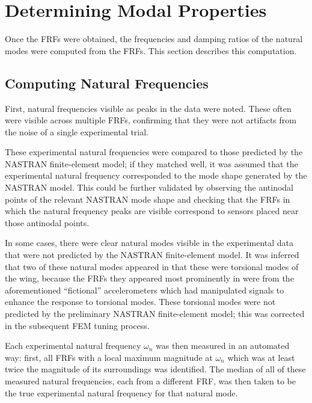 \section{Determining Modal Properties} %

Once the FRFs were obtained, the frequencies and damping ratios of the natural modes were computed from the FRFs. This section describes this computation.

\subsection{Computing Natural Frequencies}

First, natural frequencies visible as peaks in the data were noted. These often were visible across multiple FRFs, confirming that they were not artifacts from the noise of a single experimental trial.

These experimental natural frequencies were compared to those predicted by the NASTRAN finite-element model; if they matched well, it was assumed that the experimental natural frequency corresponded to the mode shape generated by the NASTRAN model. This could be further validated by observing the antinodal points of the relevant NASTRAN mode shape and checking that the FRFs in which the natural frequency peaks are visible correspond to sensors placed near those antinodal points.

In some cases, there were clear natural modes visible in the experimental data that were not predicted by the NASTRAN finite-element model. It was inferred that two of these natural modes appeared in that these were torsional modes of the wing, because the FRFs they appeared most prominently in were from the aforementioned ``fictional'' accelerometers which had manipulated signals to enhance the response to torsional modes. These torsional modes were not predicted by the preliminary NASTRAN finite-element model; this was corrected in the subsequent FEM tuning process.

Each experimental natural frequency $\omega_n$ was then measured in an automated way: first, all FRFs with a local maximum magnitude at $\omega_n$ which was at least twice the magnitude of its surroundings was identified. The median of all of these measured natural frequencies, each from a different FRF, was then taken to be the true experimental natural frequency for that natural mode.

